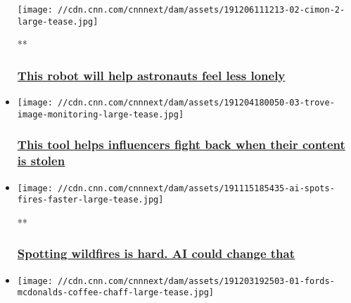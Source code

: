 \begin{itemize}
  \texttt{[image: //cdn.cnn.com/cnnnext/dam/assets/191206111213-02-cimon-2-large-tease.jpg]}

  **

  \hypertarget{this-robot-will-help-astronauts-feel-less-lonely}{%
  \subsubsection{\texorpdfstring{\href{/videos/business/2019/12/06/no-cimon-2-ai-robot-emotions-orig.cnn}{This
  robot will help astronauts feel less
  lonely}}{This robot will help astronauts feel less lonely}}\label{this-robot-will-help-astronauts-feel-less-lonely}}
\item
  \href{/2019/12/06/tech/influencers-brands-stealing-content/index.html}{}

  \texttt{[image: //cdn.cnn.com/cnnnext/dam/assets/191204180050-03-trove-image-monitoring-large-tease.jpg]}

  \hypertarget{this-tool-helps-influencers-fight-back-when-their-content-is-stolen}{%
  \subsubsection{\texorpdfstring{\href{/2019/12/06/tech/influencers-brands-stealing-content/index.html}{This
  tool helps influencers fight back when their content is
  stolen}}{This tool helps influencers fight back when their content is stolen}}\label{this-tool-helps-influencers-fight-back-when-their-content-is-stolen}}
\item
  \href{/videos/business/2019/12/03/ai-wildfire-detection-descartes-labs-orig.cnn-business}{}

  \texttt{[image: //cdn.cnn.com/cnnnext/dam/assets/191115185435-ai-spots-fires-faster-large-tease.jpg]}

  **

  \hypertarget{spotting-wildfires-is-hard-ai-could-change-that}{%
  \subsubsection{\texorpdfstring{\href{/videos/business/2019/12/03/ai-wildfire-detection-descartes-labs-orig.cnn-business}{Spotting
  wildfires is hard. AI could change
  that}}{Spotting wildfires is hard. AI could change that}}\label{spotting-wildfires-is-hard-ai-could-change-that}}
\item
  \href{/2019/12/04/business/ford-mcdonalds-coffee-chaff/index.html}{}

  \texttt{[image: //cdn.cnn.com/cnnnext/dam/assets/191203192503-01-fords-mcdonalds-coffee-chaff-large-tease.jpg]}


\end{itemize}
